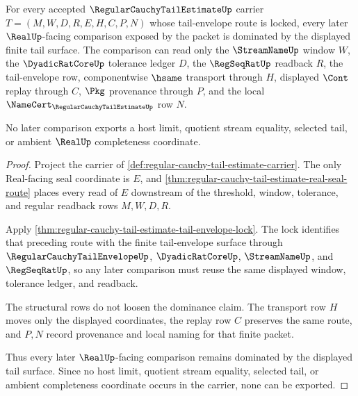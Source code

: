 \begin{theorem}
\label{thm:regular-cauchy-tail-estimate-tail-dominance}
For every accepted $\RegularCauchyTailEstimateUp$ carrier
$T=(M,W,D,R,E,H,C,P,N)$ whose tail-envelope route is locked, every later
$\RealUp$-facing comparison exposed by the packet is dominated by the displayed
finite tail surface. The comparison can read only the $\StreamNameUp$ window
$W$, the $\DyadicRatCoreUp$ tolerance ledger $D$, the $\RegSeqRatUp$ readback
$R$, the tail-envelope row, componentwise $\hsame$ transport through $H$,
displayed $\Cont$ replay through $C$, $\Pkg$ provenance through $P$, and the
local $\NameCert_{\RegularCauchyTailEstimateUp}$ row $N$.

No later comparison exports a host limit, quotient stream equality, selected
tail, or ambient $\RealUp$ completeness coordinate.
\end{theorem}
\begin{proof}
Project the carrier of
\autoref{def:regular-cauchy-tail-estimate-carrier}. The only Real-facing seal
coordinate is $E$, and \autoref{thm:regular-cauchy-tail-estimate-real-seal-route}
places every read of $E$ downstream of the threshold, window, tolerance, and
regular readback rows $M,W,D,R$.

Apply \autoref{thm:regular-cauchy-tail-estimate-tail-envelope-lock}. The lock
identifies that preceding route with the finite tail-envelope surface through
$\RegularCauchyTailEnvelopeUp$, $\DyadicRatCoreUp$, $\StreamNameUp$, and
$\RegSeqRatUp$, so any later comparison must reuse the same displayed window,
tolerance ledger, and readback.

The structural rows do not loosen the dominance claim. The transport row $H$
moves only the displayed coordinates, the replay row $C$ preserves the same
route, and $P,N$ record provenance and local naming for that finite packet.

Thus every later $\RealUp$-facing comparison remains dominated by the displayed
tail surface. Since no host limit, quotient stream equality, selected tail, or
ambient completeness coordinate occurs in the carrier, none can be exported.
\end{proof}

